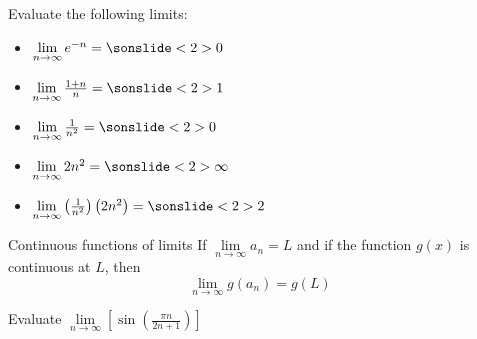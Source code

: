 \begin{frame}[t]
\label{note3.1b}
 Evaluate the following limits:\vfill
\begin{itemize}
\item $\lim\limits_{n\to\infty}{e^{-n}}=\sonslide<2>{0}$\vfill
\item $\lim\limits_{n\to\infty}\frac{1+n}{n}=\sonslide<2>{1}$\vfill
\item $\lim\limits_{n\to\infty}\frac{1}{n^2}=\sonslide<2>{0}$\vfill
\item $\lim\limits_{n\to\infty}{2n^2}=\sonslide<2>{\infty}$\vfill
\item $\lim\limits_{n\to\infty}\left(\frac{1}{n^2}\right)\left(2n^2\right)=\sonslide<2>{2}$
\end{itemize}\vfill
{}
\end{frame}
\begin{frame}[t]
\begin{block}{Continuous functions of limits}
If $\lim\limits_{n\to \infty}a_n=L$ and if the function $g(x)$ is continuous at $L$, then
\[\lim_{n \to \infty}g(a_n)=g(L)\]
\end{block}

Evaluate $\lim\limits_{n\to\infty}\left[\sin\left(\frac{\pi n}{2n+1}\right)\right]$

\end{frame}
